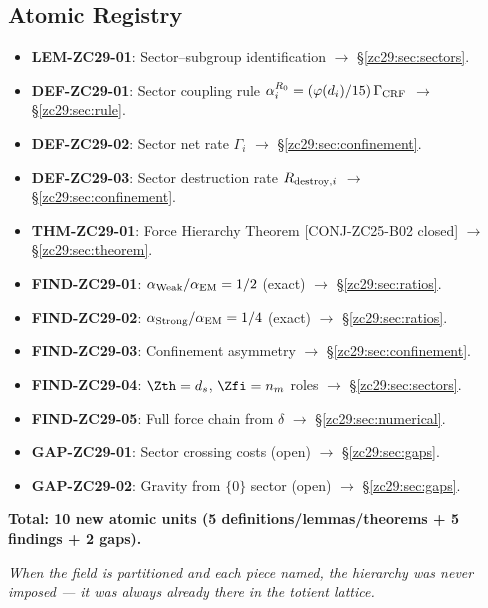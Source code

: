 \documentclass[12pt, a4paper]{article}
\begin{document}
\subsection{Atomic Registry}
\label{zc29:sec:registry}

\begin{formalbox}[title={Atomic Units in TASK-ZC29 (10 units)}]
\begin{itemize}[leftmargin=*, noitemsep]
  \item \textbf{LEM-ZC29-01}: Sector--subgroup identification
    $\to$ \S\ref{zc29:sec:sectors}.
  \item \textbf{DEF-ZC29-01}: Sector coupling rule
    $\alpha_i^{R_0} = (\varphi(d_i)/15)\,\Gamma_{\rm CRF}$
    $\to$ \S\ref{zc29:sec:rule}.
  \item \textbf{DEF-ZC29-02}: Sector net rate $\Gamma_i$
    $\to$ \S\ref{zc29:sec:confinement}.
  \item \textbf{DEF-ZC29-03}: Sector destruction rate
    $R_{{\rm destroy},i}$
    $\to$ \S\ref{zc29:sec:confinement}.
  \item \textbf{THM-ZC29-01}: Force Hierarchy Theorem
    [CONJ-ZC25-B02 closed]
    $\to$ \S\ref{zc29:sec:theorem}.
  \item \textbf{FIND-ZC29-01}: $\alpha_{\rm Weak}/\alpha_{\rm EM}=1/2$
    (exact) $\to$ \S\ref{zc29:sec:ratios}.
  \item \textbf{FIND-ZC29-02}: $\alpha_{\rm Strong}/\alpha_{\rm EM}=1/4$
    (exact) $\to$ \S\ref{zc29:sec:ratios}.
  \item \textbf{FIND-ZC29-03}: Confinement asymmetry
    $\to$ \S\ref{zc29:sec:confinement}.
  \item \textbf{FIND-ZC29-04}: $\Zth = d_s$, $\Zfi = n_m$ roles
    $\to$ \S\ref{zc29:sec:sectors}.
  \item \textbf{FIND-ZC29-05}: Full force chain from $\delta$
    $\to$ \S\ref{zc29:sec:numerical}.
  \item \textbf{GAP-ZC29-01}: Sector crossing costs (open)
    $\to$ \S\ref{zc29:sec:gaps}.
  \item \textbf{GAP-ZC29-02}: Gravity from $\{0\}$ sector (open)
    $\to$ \S\ref{zc29:sec:gaps}.
\end{itemize}
\textbf{Total: 10 new atomic units (5 definitions/lemmas/theorems
  + 5 findings + 2 gaps).}
\end{formalbox}

\bigskip
\begin{center}
\textit{%
  When the field is partitioned and each piece named,
  the hierarchy was never imposed ---
  it was always already there in the totient lattice.}
\end{center}
\end{document}
